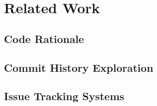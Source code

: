 \chapter{Related Work}

\section{Code Rationale}
\label{sec:Code-Rationale}

\section{Commit History Exploration}
\label{sec:Commit-History-Expl}

\section{Issue Tracking Systems}
\label{sec:Issue-Tracking-Sys}

\endinput

Any text after an \endinput is ignored.
You could put scraps here or things in progress.